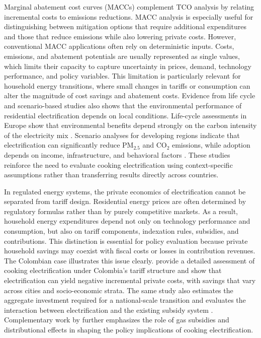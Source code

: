 \documentclass[authoryear,preprint,review,10pt]{elsarticle}
\begin{document}
Marginal abatement cost curves (MACCs) complement TCO analysis by relating incremental costs to emissions reductions. MACC analysis is especially useful for distinguishing between mitigation options that require additional expenditures and those that reduce emissions while also lowering private costs. However, conventional MACC applications often rely on deterministic inputs. Costs, emissions, and abatement potentials are usually represented as single values, which limits their capacity to capture uncertainty in prices, demand, technology performance, and policy variables. This limitation is particularly relevant for household energy transitions, where small changes in tariffs or consumption can alter the magnitude of cost savings and abatement costs. Evidence from life cycle and scenario-based studies also shows that the environmental performance of residential electrification depends on local conditions. Life-cycle assessments in Europe show that environmental benefits depend strongly on the carbon intensity of the electricity mix \citep{cimini2022}. Scenario analyses for developing regions indicate that electrification can significantly reduce PM$_{2.5}$ and CO$_2$ emissions, while adoption depends on income, infrastructure, and behavioral factors \citep{floess2023}. These studies reinforce the need to evaluate cooking electrification using context-specific assumptions rather than transferring results directly across countries.

In regulated energy systems, the private economics of electrification cannot be separated from tariff design. Residential energy prices are often determined by regulatory formulas rather than by purely competitive markets. As a result, household energy expenditures depend not only on technology performance and consumption, but also on tariff components, indexation rules, subsidies, and contributions. This distinction is essential for policy evaluation because private household savings may coexist with fiscal costs or losses in contribution revenues. The Colombian case illustrates this issue clearly. \citet{cabrales2023costos} provide a detailed assessment of cooking electrification under Colombia's tariff structure and show that electrification can yield negative incremental private costs, with savings that vary across cities and socio-economic strata. The same study also estimates the aggregate investment required for a national-scale transition and evaluates the interaction between electrification and the existing subsidy system \citep{cabrales2023costos}. Complementary work by \citet{cabrales2025subsidios_gas} further emphasizes the role of gas subsidies and distributional effects in shaping the policy implications of cooking electrification.
\end{document}
